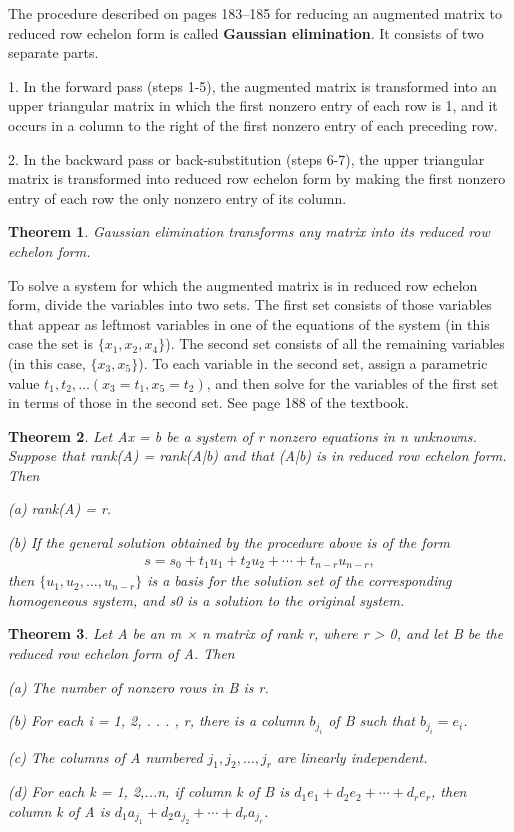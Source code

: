 \documentclass{article}
\newcommand{\bd}[1]{\textbf{#1}}
\theoremstyle{plain}
\newtheorem{theorem}{Theorem}[section]
\theoremstyle{plain} %
\begin{document}
The procedure described on pages 183–185 for reducing an augmented matrix to reduced row echelon form is called \bd{Gaussian elimination}. It consists of two separate parts.

1. In the forward pass (steps 1-5), the augmented matrix is transformed into an upper triangular matrix in which the first nonzero entry of each row is 1, and it occurs in a column to the right of the first nonzero entry of each preceding row.

2. In the backward pass or back-substitution (steps 6-7), the upper triangular matrix is transformed into reduced row echelon form by making the first nonzero entry of each row the only nonzero entry of its column.

\begin{theorem}
  Gaussian elimination transforms any matrix into its reduced row echelon form.
\end{theorem}

To solve a system for which the augmented matrix is in reduced row echelon form, divide the variables into two sets. The first set consists of those variables that appear as leftmost variables in one of the equations of the system (in this case the set is $\{x_1, x_2, x_4\}$). The second set consists of all the remaining variables (in this case, $\{x_3, x_5\}$). To each variable in the second set, assign a parametric value $t_1, t_2,\ldots (x_3 = t_1, x_5 = t_2)$, and then solve for the variables of the first set in terms of those in the second set. See page 188 of the textbook.

\begin{theorem}
  Let Ax = b be a system of r nonzero equations in n unknowns. Suppose that rank(A) = rank(A|b) and that (A|b) is in reduced row echelon form. Then  
  
  (a) rank(A) = r.

(b) If the general solution obtained by the procedure above is of the form
\begin{align*}
s = s_0 + t_1u_1 + t_2u_2 + \cdots + t_{n−r}u_{n−r},
\end{align*}
then $\{u_1, u_2,\ldots,u_{n−r}\}$ is a basis for the solution set of the corresponding homogeneous system, and s0 is a solution to the original system.
\end{theorem}

\begin{theorem}
  Let A be an m × n matrix of rank r, where r > 0, and let B be the reduced row echelon form of A. Then

(a) The number of nonzero rows in B is r.

(b) For each i = 1, 2, . . . , r, there is a column $b_{j_i}$ of B such that $b_{j_i} = e_i$.

(c) The columns of A numbered $j_1, j_2,\ldots,j_r$ are linearly independent.

(d) For each k = 1, 2,...n, if column k of B is $d_1e_1 +d_2e_2 +\cdots+d_re_r$, then column k of A is $d_1a_{j_1} + d_2a_{j_2} + \cdots + d_ra_{j_r}$.
\end{theorem}
\end{document}
